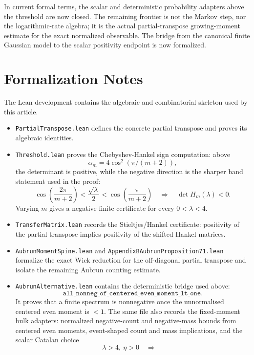 \documentclass[11pt,reqno]{amsart}
\begin{document}
In current formal terms, the scalar and deterministic probability adapters
above the threshold are now closed.  The remaining frontier is not the
Markov step, nor the logarithmic-rate algebra; it is the actual
partial-transpose growing-moment estimate for the exact normalized observable.
The bridge from the canonical finite Gaussian model to the scalar positivity
endpoint is now formalized.

\section{Formalization Notes}

The Lean development contains the algebraic and combinatorial skeleton used
by this article.

\begin{itemize}[leftmargin=*]
\item \texttt{PartialTranspose.lean} defines the concrete
  partial transpose and proves its algebraic identities.
\item \texttt{Threshold.lean} proves the Chebyshev-Hankel sign computation:
  above
  \[
    \alpha_m=4\cos^2(\pi/(m+2)),
  \]
  the determinant is positive, while the negative direction is the sharper
  band statement used in the proof:
  \[
    \cos\left(\frac{2\pi}{m+2}\right)
    <
    \frac{\sqrt\lambda}{2}
    <
    \cos\left(\frac{\pi}{m+2}\right)
    \quad\Longrightarrow\quad
    \det H_m(\lambda)<0.
  \]
  Varying \(m\) gives a negative finite certificate for every
  \(0<\lambda<4\).
\item \texttt{TransferMatrix.lean} records the
  Stieltjes/Hankel certificate: positivity of the partial transpose implies
  positivity of the shifted Hankel matrices.
\item \texttt{AubrunMomentSpine.lean} and
  \texttt{AppendixBAubrunProposition71.lean} formalize the
  exact Wick reduction for the off-diagonal partial transpose and isolate the
  remaining Aubrun counting estimate.
\item \texttt{AubrunAlternative.lean} contains the deterministic bridge used
  above:
  \[
    \texttt{all\_nonneg\_of\_centered\_even\_moment\_lt\_one}.
  \]
  It proves that a finite spectrum is nonnegative once the unnormalised
  centered even moment is \(<1\).  The same file also records the fixed-moment
  bulk adapters: normalized negative-count and negative-mass bounds from
  centered even moments, event-shaped count and mass implications, and the
  scalar Catalan choice
  \[
    \lambda>4,\ \eta>0
    \quad\Longrightarrow\quad
\]
\end{itemize}
\end{document}
